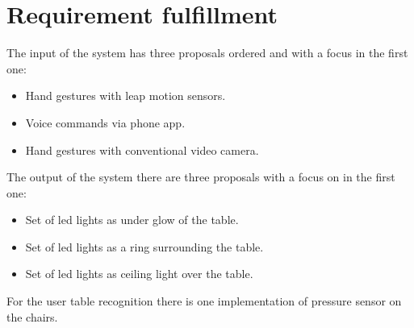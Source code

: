 \documentclass{article}
\begin{document}
\section{Requirement fulfillment}
The input of the system has three proposals ordered and with a focus in the first one:
\begin{itemize}
    \item Hand gestures with leap motion sensors.
    \item Voice commands via phone app.
    \item Hand gestures with conventional video camera.
\end{itemize}
The output of the system there are three proposals with a focus on in the first one:
\begin{itemize}
    \item Set of led lights as under glow of the table.
    \item Set of led lights as a ring surrounding the table.
    \item Set of led lights as ceiling light over the table.
\end{itemize}
For the user table recognition there is one implementation of pressure sensor on the chairs.

\end{document}
